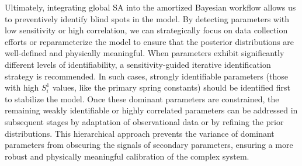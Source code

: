 Ultimately, integrating global \ac{SA} into the amortized Bayesian workflow allows us to preventively identify blind spots in the model. By detecting parameters with low sensitivity or high correlation, we can strategically focus on data collection efforts or reparameterize the model to ensure that the posterior distributions are well-defined and physically meaningful. When parameters exhibit significantly different levels of identifiability, a sensitivity-guided iterative identification strategy is recommended. In such cases, strongly identifiable parameters (those with high $S^1_i$ values, like the primary spring constants) should be identified first to stabilize the model. Once these dominant parameters are constrained, the remaining weakly identifiable or highly correlated parameters can be addressed in subsequent stages by adaptation of observational data or by refining the prior distributions. This hierarchical approach prevents the variance of dominant parameters from obscuring the signals of secondary parameters, ensuring a more robust and physically meaningful calibration of the complex system.

